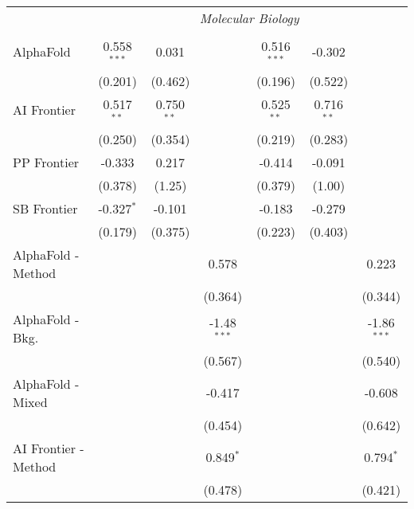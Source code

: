 \begin{tabular}{lcccccc}
 & \multicolumn{6}{c}{\textit{Molecular Biology}} \\ \\
   AlphaFold            & 0.558$^{***}$ & 0.031        &               & 0.516$^{***}$ & -0.302       &   \\   
                        & (0.201)       & (0.462)      &               & (0.196)       & (0.522)      &   \\   
   AI Frontier          & 0.517$^{**}$  & 0.750$^{**}$ &               & 0.525$^{**}$  & 0.716$^{**}$ &   \\   
                        & (0.250)       & (0.354)      &               & (0.219)       & (0.283)      &   \\   
   PP Frontier          & -0.333        & 0.217        &               & -0.414        & -0.091       &   \\   
                        & (0.378)       & (1.25)       &               & (0.379)       & (1.00)       &   \\   
   SB Frontier          & -0.327$^{*}$  & -0.101       &               & -0.183        & -0.279       &   \\   
                        & (0.179)       & (0.375)      &               & (0.223)       & (0.403)      &   \\   
   AlphaFold - Method   &               &              & 0.578         &               &              & 0.223\\   
                        &               &              & (0.364)       &               &              & (0.344)\\   
   AlphaFold - Bkg.     &               &              & -1.48$^{***}$ &               &              & -1.86$^{***}$\\   
                        &               &              & (0.567)       &               &              & (0.540)\\   
   AlphaFold - Mixed    &               &              & -0.417        &               &              & -0.608\\   
                        &               &              & (0.454)       &               &              & (0.642)\\   
   AI Frontier - Method &               &              & 0.849$^{*}$   &               &              & 0.794$^{*}$\\   
                        &               &              & (0.478)       &               &              & (0.421)\\   

\end{tabular}
